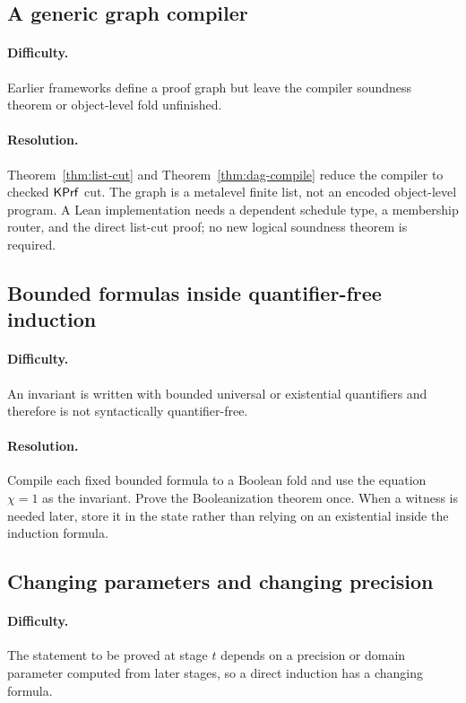 \subsection{A generic graph compiler}

\paragraph{Difficulty.}
Earlier frameworks define a proof graph but leave the compiler soundness theorem
or object-level fold unfinished.

\paragraph{Resolution.}
Theorem~\ref{thm:list-cut} and Theorem~\ref{thm:dag-compile} reduce the compiler
to checked \(\mathsf{KPrf}\) cut.  The graph is a metalevel finite list, not an encoded
object-level program.  A Lean implementation needs a dependent schedule type,
a membership router, and the direct list-cut proof; no new logical soundness
theorem is required.

\subsection{Bounded formulas inside quantifier-free induction}

\paragraph{Difficulty.}
An invariant is written with bounded universal or existential quantifiers and
therefore is not syntactically quantifier-free.

\paragraph{Resolution.}
Compile each fixed bounded formula to a Boolean fold and use the equation
\(\chi=1\) as the invariant.  Prove the Booleanization theorem once.  When a
witness is needed later, store it in the state rather than relying on an
existential inside the induction formula.

\subsection{Changing parameters and changing precision}

\paragraph{Difficulty.}
The statement to be proved at stage \(t\) depends on a precision or domain
parameter computed from later stages, so a direct induction has a changing
formula.

